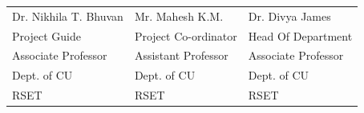 \begin{flushleft}


	\begin{longtable}{p{5.8cm} p{5.8cm} p{5.8cm}}
		{Dr. Nikhila T. Bhuvan} & {Mr. Mahesh K.M.}      & {Dr. Divya James}     \\
		{Project Guide}         & {Project Co-ordinator} & {Head Of Department}  \\
		{Associate Professor}   & {Assistant Professor}  & {Associate Professor} \\
		{Dept. of CU}           & {Dept. of CU}          & {Dept. of CU}         \\
		{RSET}                  & {RSET}                 & {RSET}                \\
	\end{longtable}
\end{flushleft}
\vspace{2cm}
